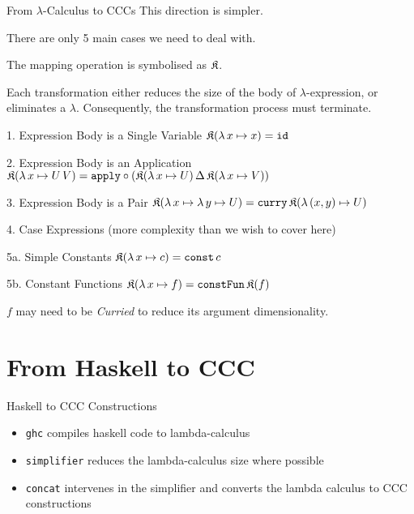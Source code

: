 \documentclass[10pt]{beamer}
\newcommand{\program}[1]{\texttt{#1}}
\newcommand{\id}{\mathtt{id}}
\newcommand{\apply}{\mathtt{apply}}
\newcommand{\curry}{\mathtt{curry}}
\newcommand{\lamf}[2]{\ensuremath{\lambda\, #1 \mapsto #2}}
\newcommand{\lamtoccc}[1]{\ensuremath{\frak{K}(#1)}}
\newcommand{\delprod}[2]{\ensuremath{#1\,\Delta\,#2}}
\newcommand{\const}{\ensuremath{\mathtt{const}}}
\newcommand{\constFun}{\ensuremath{\mathtt{constFun}}}
\theoremstyle{definition}
\theoremstyle{remark}
\numberwithin{equation}{section}
\begin{document}
\begin{frame}[fragile]{From $\lambda$-Calculus to CCCs}
  This direction is simpler.

  There are only 5 main cases we need to deal with.

  The mapping operation is symbolised as $\frak{K}$.

  Each transformation either reduces the size of the body of $\lambda$-expression,
  or eliminates a $\lambda$.
  Consequently, the transformation process must terminate.
\end{frame}

\begin{frame}[fragile]{1. Expression Body is a Single Variable}
  $\lamtoccc{\lamf{x}{x}} = \id$
\end{frame}

\begin{frame}[fragile]{2. Expression Body is an Application}
  $\lamtoccc{\lamf{x}{U\,V}} = \apply \circ (\delprod{\lamtoccc{\lamf{x}{U}}}{\lamtoccc{\lamf{x}{V}}})$
\end{frame}

\begin{frame}[fragile]{3. Expression Body is a Pair}
  $\lamtoccc{\lamf{x}{\lamf{y}{U}}} = \curry\, \lamtoccc{\lamf{(x,y)}{U}}$
\end{frame}

\begin{frame}[fragile]{4. Case Expressions}
  (more complexity than we wish to cover here)
\end{frame}

\begin{frame}[fragile]{5a. Simple Constants}
  $\lamtoccc{\lamf{x}{c}} = \const\, c$
\end{frame}

\begin{frame}[fragile]{5b. Constant Functions}
  $\lamtoccc{\lamf{x}{f}} = \constFun\, \lamtoccc{f}$

  $f$ may need to be \emph{Curried} to reduce its argument dimensionality.
\end{frame}

\section{From Haskell to CCC} %

\begin{frame}[fragile]{Haskell to CCC Constructions}
  \begin{itemize}
    \item \program{ghc} compiles haskell code to lambda-calculus
    \item \program{simplifier} reduces the lambda-calculus size where possible
    \item \program{concat} intervenes in the simplifier and converts the lambda calculus to CCC constructions
  \end{itemize}
\end{frame}
\end{document}
